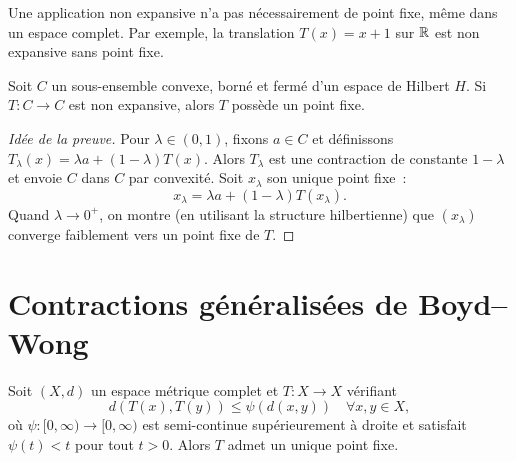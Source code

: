 \begin{remarque}
Une application non expansive n'a pas n\'ecessairement de point fixe, m\^eme dans
un espace complet. Par exemple, la translation $T(x) = x + 1$ sur $\mathbb{R}$ est
non expansive sans point fixe.
\end{remarque}

\begin{theoreme}
Soit $C$ un sous-ensemble convexe, born\'e et ferm\'e d'un espace de Hilbert $H$.
Si $T : C \to C$ est non expansive, alors $T$ poss\`ede un point fixe.
\end{theoreme}

\begin{proof}[Id\'ee de la preuve]
Pour $\lambda \in (0,1)$, fixons $a \in C$ et d\'efinissons
$T_\lambda(x) = \lambda a + (1-\lambda) T(x)$. Alors $T_\lambda$ est une
contraction de constante $1 - \lambda$ et envoie $C$ dans $C$ par convexit\'e.
Soit $x_\lambda$ son unique point fixe~:
\[
    x_\lambda = \lambda a + (1-\lambda) T(x_\lambda).
\]
Quand $\lambda \to 0^+$, on montre (en utilisant la structure hilbertienne)
que $(x_\lambda)$ converge faiblement vers un point fixe de $T$.
\end{proof}

\section{Contractions g\'en\'eralis\'ees de Boyd--Wong}

\begin{theoreme}
Soit $(X, d)$ un espace m\'etrique complet et $T : X \to X$ v\'erifiant
\[
    d(T(x), T(y)) \leq \psi(d(x, y)) \quad \forall x, y \in X,
\]
o\`u $\psi : [0, \infty) \to [0, \infty)$ est semi-continue sup\'erieurement
\`a droite et satisfait $\psi(t) < t$ pour tout $t > 0$.
Alors $T$ admet un unique point fixe.
\end{theoreme}

